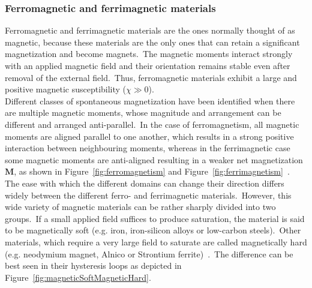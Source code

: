 \subsubsection{Ferromagnetic and ferrimagnetic materials}\label{subsec:ferromagneticAndFerrimagneticMaterials}
Ferromagnetic and ferrimagnetic materials are the ones normally thought of as magnetic, because these materials are the only ones that can retain a significant magnetization and become magnets.\ The magnetic moments interact strongly with an applied magnetic field and their orientation remains stable even after removal of the external field.\ Thus, ferromagnetic materials exhibit a large and positive magnetic susceptibility ($\chi \gg 0$).\\
Different classes of spontaneous magnetization have been identified when there are multiple magnetic moments, whose magnitude and arrangement can be different and arranged anti-parallel.\ In the case of ferromagnetism, all magnetic moments are aligned parallel to one another, which results in a strong positive interaction between neighbouring moments, whereas in the ferrimagnetic case some magnetic moments are anti-aligned resulting in a weaker net magnetization $\mathbf{M}$, as shown in Figure~\ref{fig:ferromagnetism} and Figure~\ref{fig:ferrimagnetism}~\cite{Chikazumi1964}.\\
The ease with which the different domains can change their direction differs widely between the different ferro- and ferrimagnetic materials.\ However, this wide variety of magnetic materials can be rather sharply divided into two groups.\ If a small applied field suffices to produce saturation, the material is said to be magnetically soft (e.g. iron, iron-silicon alloys or low-carbon steels).\ Other materials, which require a very large field to saturate are called magnetically hard (e.g. neodymium magnet, Alnico or Strontium ferrite)~\cite{Cullity2011,Chikazumi1964,Krishnan2016}.\ The difference can be best seen in their hysteresis loops as depicted in Figure~\ref{fig:magneticSoftMagneticHard}.\
